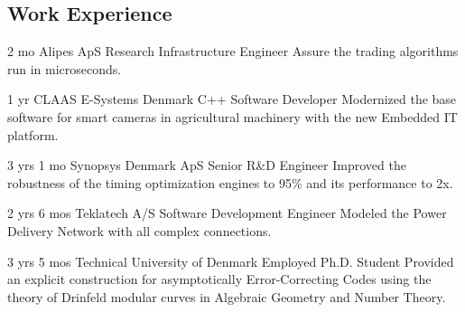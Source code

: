 \documentclass[11pt]{article} %
\begin{document}
\begin{paracol}{2}
\switchcolumn

\section{Work Experience}




{2 mo} %
{Alipes ApS} %
{Research Infrastructure Engineer} %
{Assure the trading algorithms run in microseconds.
} %

{1 yr} %
{CLAAS E-Systems Denmark} %
{C++ Software Developer} %
{Modernized the base software for smart cameras in agricultural machinery with the new Embedded IT platform.
} %


{3 yrs 1 mo} %
{Synopsys Denmark ApS} %
{Senior R\&D Engineer} %
{Improved the robustness of the timing optimization engines to 95\% and its performance to 2x.
} %


{2 yrs 6 mos} %
{Teklatech A/S} %
{Software Development Engineer} %
{Modeled the Power Delivery Network with all complex connections.}  %


{3 yrs 5 mos} %
{Technical University of Denmark} %
{Employed Ph.D. Student} %
{Provided an explicit construction for asymptotically Error-Correcting Codes using the theory of Drinfeld modular curves in Algebraic Geometry and Number Theory.} %


\end{paracol}
\end{document}
